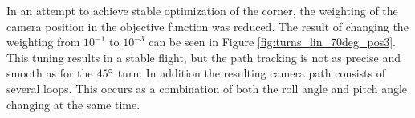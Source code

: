 In an attempt to achieve stable optimization of the corner, the weighting of the camera position in the objective function was reduced. The result of changing the weighting from $10^{-1}$ to $10^{-3}$ can be seen in Figure \ref{fig:turns_lin_70deg_pos3}. This tuning results in a stable flight, but the path tracking is not as precise and smooth as for the $45\degree$ turn. In addition the resulting camera path consists of several loops. This occurs as a combination of both the roll angle and pitch angle changing at the same time.

\begin{figure}[h]
\end{figure}
